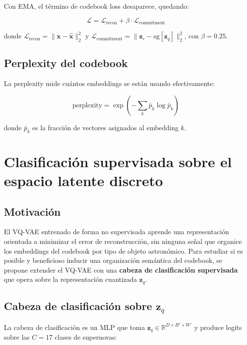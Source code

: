 Con EMA, el término de codebook loss desaparece, quedando:

\begin{equation}
\mathcal{L} = \mathcal{L}_{\text{recon}} + \beta \cdot \mathcal{L}_{\text{commitment}}
\end{equation}

donde $\mathcal{L}_{\text{recon}} = \|\mathbf{x} - \hat{\mathbf{x}}\|_2^2$ y $\mathcal{L}_{\text{commitment}} = \|\mathbf{z}_e - \text{sg}[\mathbf{z}_q]\|_2^2$, con $\beta = 0.25$.

\subsection{Perplexity del codebook}

La perplexity mide cuántos embeddings se están usando efectivamente:

\begin{equation}
\text{perplexity} = \exp\left(-\sum_k \bar{p}_k \log \bar{p}_k\right)
\end{equation}

donde $\bar{p}_k$ es la fracción de vectores asignados al embedding $k$.

\section{Clasificación supervisada sobre el espacio latente discreto}

\subsection{Motivación}

El VQ-VAE entrenado de forma no supervisada aprende una representación orientada a minimizar el error de reconstrucción, sin ninguna señal que organice los embeddings del codebook por tipo de objeto astronómico. Para estudiar si es posible y beneficioso inducir una organización semántica del codebook, se propone extender el VQ-VAE con una \textbf{cabeza de clasificación supervisada} que opera sobre la representación cuantizada $\mathbf{z}_q$.

\subsection{Cabeza de clasificación sobre $\mathbf{z}_q$}
\label{sec:cls_zq}

La cabeza de clasificación es un MLP que toma $\mathbf{z}_q \in \mathbb{R}^{D \times H' \times W'}$ y produce logits sobre las $C = 17$ clases de supernovas:

